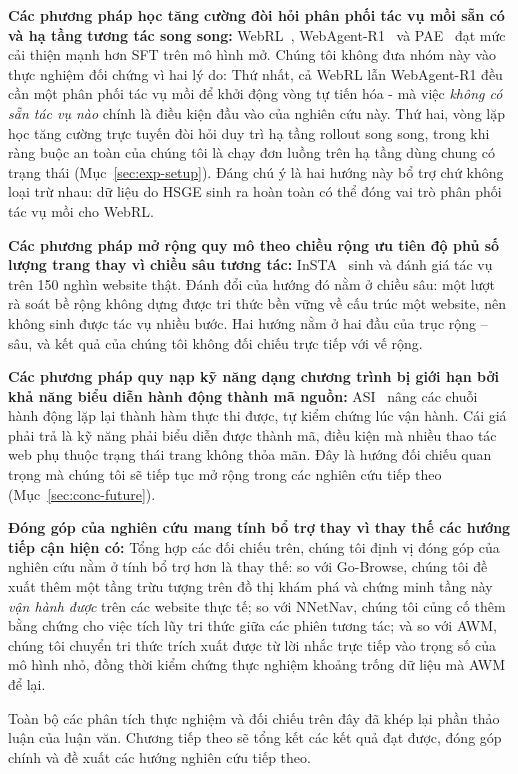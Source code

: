 \textbf{Các phương pháp học tăng cường đòi hỏi phân phối tác vụ mồi sẵn có và hạ tầng tương tác song song:} WebRL~\cite{qi2025webrl}, WebAgent-R1~\cite{wei2025webagentr1} và PAE~\cite{zhou2024pae} đạt mức cải thiện mạnh hơn SFT trên mô hình mở. Chúng tôi không đưa nhóm này vào thực nghiệm đối chứng vì hai lý do: Thứ nhất, cả WebRL lẫn WebAgent-R1 đều cần một phân phối tác vụ mồi để khởi động vòng tự tiến hóa - mà việc \emph{không có sẵn tác vụ nào} chính là điều kiện đầu vào của nghiên cứu này. Thứ hai, vòng lặp học tăng cường trực tuyến đòi hỏi duy trì hạ tầng rollout song song, trong khi ràng buộc an toàn của chúng tôi là chạy đơn luồng trên hạ tầng dùng chung có trạng thái (Mục~\ref{sec:exp-setup}). Đáng chú ý là hai hướng này bổ trợ chứ không loại trừ nhau: dữ liệu do HSGE sinh ra hoàn toàn có thể đóng vai trò phân phối tác vụ mồi cho WebRL.

\textbf{Các phương pháp mở rộng quy mô theo chiều rộng ưu tiên độ phủ số lượng trang thay vì chiều sâu tương tác:} InSTA~\cite{trabucco2025insta} sinh và đánh giá tác vụ trên 150 nghìn website thật. Đánh đổi của hướng đó nằm ở chiều sâu: một lượt rà soát bề rộng không dựng được tri thức bền vững về cấu trúc một website, nên không sinh được tác vụ nhiều bước. Hai hướng nằm ở hai đầu của trục rộng -- sâu, và kết quả của chúng tôi không đối chiếu trực tiếp với vế rộng.

\textbf{Các phương pháp quy nạp kỹ năng dạng chương trình bị giới hạn bởi khả năng biểu diễn hành động thành mã nguồn:} ASI~\cite{wang2025asi} nâng các chuỗi hành động lặp lại thành hàm thực thi được, tự kiểm chứng lúc vận hành. Cái giá phải trả là kỹ năng phải biểu diễn được thành mã, điều kiện mà nhiều thao tác web phụ thuộc trạng thái trang không thỏa mãn. Đây là hướng đối chiếu quan trọng mà chúng tôi sẽ tiếp tục mở rộng trong các nghiên cứu tiếp theo (Mục~\ref{sec:conc-future}).

\vspace{0.5em}
\noindent
\textbf{Đóng góp của nghiên cứu mang tính bổ trợ thay vì thay thế các hướng tiếp cận hiện có:} Tổng hợp các đối chiếu trên, chúng tôi định vị đóng góp của nghiên cứu nằm ở tính bổ trợ hơn là thay thế: so với Go-Browse, chúng tôi đề xuất thêm một tầng trừu tượng trên đồ thị khám phá và chứng minh tầng này \emph{vận hành được} trên các website thực tế; so với NNetNav, chúng tôi củng cố thêm bằng chứng cho việc tích lũy tri thức giữa các phiên tương tác; và so với AWM, chúng tôi chuyển tri thức trích xuất được từ lời nhắc trực tiếp vào trọng số của mô hình nhỏ, đồng thời kiểm chứng thực nghiệm khoảng trống dữ liệu mà AWM để lại.

\vspace{1em}
\noindent
Toàn bộ các phân tích thực nghiệm và đối chiếu trên đây đã khép lại phần thảo luận của luận văn. Chương tiếp theo sẽ tổng kết các kết quả đạt được, đóng góp chính và đề xuất các hướng nghiên cứu tiếp theo.

